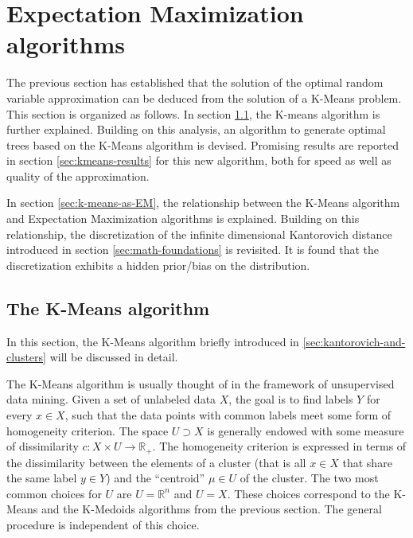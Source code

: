 \section{Expectation Maximization algorithms}
\label{sec:expect-max-algos}
The previous section has established that the solution of the optimal random variable approximation can be deduced from the solution of a K-Means problem.
This section is organized as follows.
In section \ref{sec:k-means-standard}, the K-means algorithm is further explained.
Building on this analysis, an algorithm to generate optimal trees based on the K-Means algorithm is devised.
Promising results are reported in section \ref{sec:kmeans-results} for this new algorithm, both for speed as well as quality of the approximation.

In section \ref{sec:k-means-as-EM}, the relationship between the K-Means algorithm and Expectation Maximization algorithms is explained.
Building on this relationship, the discretization of the infinite dimensional Kantorovich distance introduced in section \ref{sec:math-foundations} is revisited.
It is found that the discretization exhibits a hidden prior/bias on the distribution.
\subsection{The K-Means algorithm}
\label{sec:k-means-standard}
In this section, the K-Means algorithm briefly introduced in \ref{sec:kantorovich-and-clusters} will be discussed in detail.

The K-Means algorithm is usually thought of in the framework of unsupervised data mining.
Given a set of unlabeled data $X$, the goal is to find labels $Y$ for every $x\in X$, such that the data points with common labels meet some form of homogeneity criterion.
The space $U\supset X$ is generally endowed with some measure of dissimilarity $c: X\times U\rightarrow \mathbb{R}_+$.
The homogeneity criterion is expressed in terms of the dissimilarity between the elements of a cluster (that is all $x\in X$ that share the same label $y\in Y$) and the ``centroid'' $\mu\in U$ of the cluster.
The two most common choices for $U$ are $U=\mathbb{R}^n$ and  $U=X$.
These choices correspond to the K-Means and the K-Medoids algorithms from the previous section.
The general procedure is independent of this choice.

